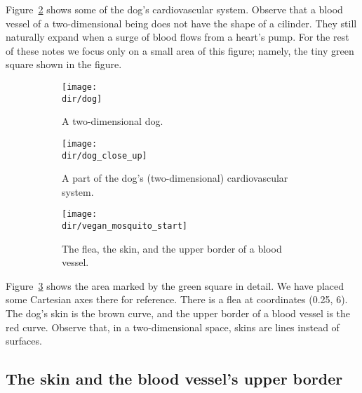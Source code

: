 Figure~\ref{fig:dog_close_up} shows some of the dog's cardiovascular system. Observe that a blood vessel of a two-dimensional being does not have the shape of a cilinder. They still naturally expand when a surge of blood flows from a heart's pump. For the rest of these notes we focus only on a small area of this figure; namely, the tiny green square shown in the figure.

\begin{figure}
\centering
\begin{subfigure}[b]{0.45\textwidth}
\centering
\texttt{[image: \\dir/dog]}
\caption{A two-dimensional dog.}
\label{fig:dog}
\end{subfigure}

\begin{subfigure}[p]{0.45\textwidth}
\centering
\texttt{[image: \\dir/dog\_close\_up]}
\caption{A part of the dog's (two-dimensional) cardiovascular system.}
\label{fig:dog_close_up}
\end{subfigure}

\begin{subfigure}[p]{0.45\textwidth}
\centering
        \texttt{[image: \\dir/vegan\_mosquito\_start]}
        \caption{The flea, the skin, and the upper border of a blood vessel.}
        \label{fig:skin_vessel_simp}
\end{subfigure}
\caption{}
\label{fig:dog_vessel_flea}
\end{figure}

Figure~\ref{fig:skin_vessel_simp} shows the area marked by the green square in detail. We have placed some Cartesian axes there for reference. There is a flea at coordinates (0.25, 6). The dog's skin is the brown curve, and the upper border of a blood vessel is the red curve. Observe that, in a two-dimensional space, skins are lines instead of surfaces.

\subsection{The skin and the blood vessel's upper border}

\newcommand{\skin}{\mathit{skin}}
\newcommand{\vessel}{\mathit{vessel}}


